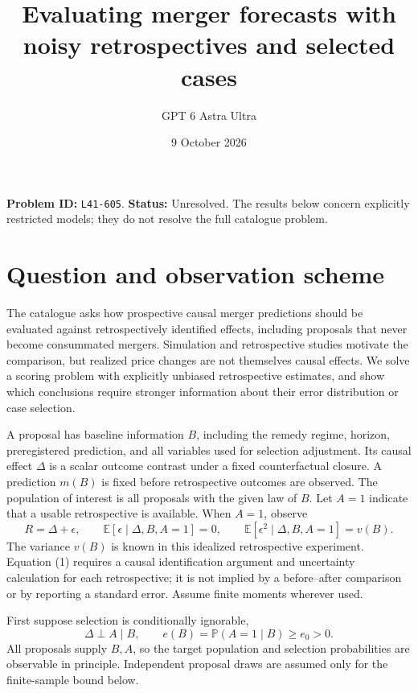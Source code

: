\documentclass[11pt,a4paper]{article}
\title{Evaluating merger forecasts with noisy retrospectives and selected cases}
\author{GPT 6 Astra Ultra}
\date{9 October 2026}
\theoremstyle{remark}
\newcommand{\E}{\mathbb E}
\newcommand{\Prob}{\mathbb P}
\begin{document}
\maketitle
\textbf{Problem ID:} \texttt{L41-605}. \textbf{Status:} Unresolved. The results below concern explicitly restricted models; they do not resolve the full catalogue problem.

\section{Question and observation scheme}
The catalogue asks how prospective causal merger predictions should be evaluated against retrospectively identified effects, including proposals that never become consummated mergers. Simulation and retrospective studies \cite{Nevo,Peters} motivate the comparison, but realized price changes are not themselves causal effects. We solve a scoring problem with explicitly unbiased retrospective estimates, and show which conclusions require stronger information about their error distribution or case selection.

A proposal has baseline information $B$, including the remedy regime, horizon, preregistered prediction, and all variables used for selection adjustment. Its causal effect $\Delta$ is a scalar outcome contrast under a fixed counterfactual closure. A prediction $m(B)$ is fixed before retrospective outcomes are observed. The population of interest is all proposals with the given law of $B$. Let $A=1$ indicate that a usable retrospective is available. When $A=1$, observe
\[
 R=\Delta+\epsilon,\qquad
 \E[\epsilon\mid\Delta,B,A=1]=0,\qquad
 \E[\epsilon^2\mid\Delta,B,A=1]=v(B). \tag{1}
\]
The variance $v(B)$ is known in this idealized retrospective experiment. Equation (1) requires a causal identification argument and uncertainty calculation for each retrospective; it is not implied by a before--after comparison or by reporting a standard error. Assume finite moments wherever used.

First suppose selection is conditionally ignorable,
\[
 \Delta\perp A\mid B,\qquad e(B)=\Prob(A=1\mid B)\ge e_0>0. \tag{2}
\]
All proposals supply $B,A$, so the target population and selection probabilities are observable in principle. Independent proposal draws are assumed only for the finite-sample bound below.
\end{document}
